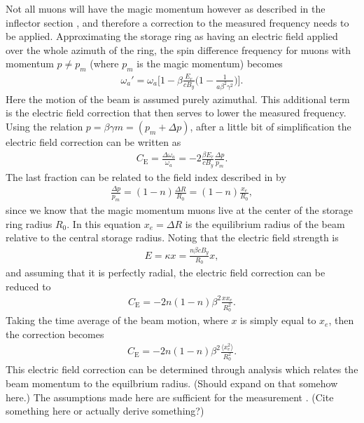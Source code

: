 Not all muons will have the magic momentum however as described in the inflector section , and therefore a correction to the measured \wa frequency needs to be applied. Approximating the storage ring as having an electric field applied over the whole azimuth of the ring, the spin difference frequency for muons with momentum $p \neq p_{m}$ (where $p_{m}$ is the magic momentum) becomes  
        \begin{align} \label{eq:wafinal}
            \omega_{a}' = \omega_{a} \Big[ 1 - \beta \frac{E_{r}}{c B_{y}} \Big( 1 - \frac{1}{a \beta^{2} \gamma^{2}} \Big) \Big].
        \end{align}
Here the motion of the beam is assumed purely azimuthal. This additional term is the electric field correction that then serves to lower the measured \wa frequency. Using the relation $p = \beta \gamma m = (p_{m} + \Delta p)$, after a little bit of simplification the electric field correction can be written as
        \begin{align}
            C_{\text{E}} = \frac{\Delta\omega_{a}}{\omega_{a}} = -2 \frac{\beta E_{r}}{c B_{y}} \frac{\Delta p}{p_{m}}.
        \end{align}
The last fraction can be related to the field index described in  by
        \begin{align}
            \frac{\Delta p}{p_{m}} = (1-n) \frac{\Delta R}{R_{0}} = (1-n) \frac{x_{e}}{R_{0}}, 
        \end{align}
since we know that the magic momentum muons live at the center of the storage ring radius $R_{0}$. In this equation $x_{e} = \Delta R$ is the equilibrium radius of the beam relative to the central storage radius. Noting that the electric field strength is 
        \begin{align}
            E = \kappa x = \frac{n \beta c B_{y}}{R_{0}} x,
        \end{align}
and assuming that it is perfectly radial, the electric field correction can be reduced to 
        \begin{align}
            C_{\text{E}} = -2n (1-n) \beta^{2} \frac{x x_{e}}{R_{0}^{2}}.
        \end{align}
Taking the time average of the beam motion, where $x$ is simply equal to $x_{e}$, then the correction becomes
        \begin{align}
            C_{\text{E}} = -2n (1-n) \beta^{2} \frac{\langle x_{e}^{2} \rangle}{R_{0}^{2}}.
        \end{align}
This electric field correction can be determined through analysis which relates the beam momentum to the equilbrium radius. (Should expand on that somehow here.) The assumptions made here are sufficient for the \gmtwo measurement \cite{something}. (Cite something here or actually derive something?)


